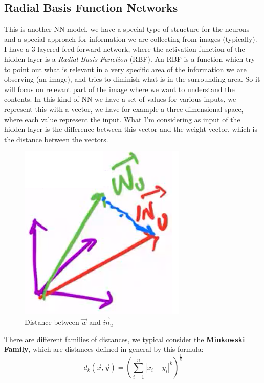 \documentclass{article}
\begin{document}
\subsection{Radial Basis Function Networks}
This is another NN model, we have a special type of structure for the neurons and a special approach
for information we are collecting from images (typically).
\newline\newline
I have a 3-layered feed forward network, where the activation function of the hidden layer is a \textit{
    Radial Basis Function} (RBF).
\newline\newline
An RBF is a function which try to point out what is relevant in a very specific area of the information
we are observing (an image), and tries to diminish what is in the surrounding area. So it will focus on
relevant part of the image where we want to understand the contents.
\newline\newline
In this kind of NN we have a set of values for various inputs, we represent this with a vector, we have
for example a three dimensional space, where each value represent the input. What I'm considering as input
of the hidden layer is the difference between this vector and the weight vector, which is the distance
between the vectors.
\begin{figure}[H]
    \centering
    \includegraphics[scale=0.5]{images/rbf.png}
    \caption{Distance between $\vec{w}$ and $\vec{in}_{u}$}
\end{figure}
There are different families of distances, we typical consider the \textbf{Minkowski Family}, which are
distances defined in general by this formula:
$$d_k(\vec{x},\vec{y})=\left(\sum_{i=1}^n |x_i-y_i|^k\right)^{\frac{1}{k}}$$
\end{document}
